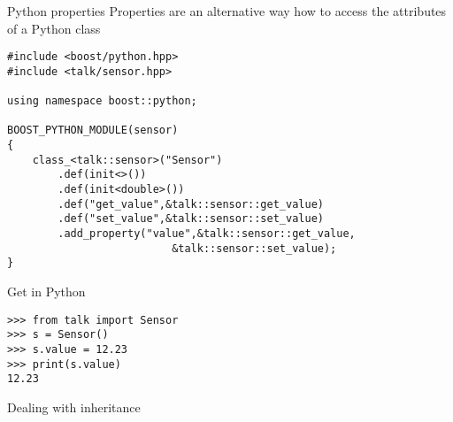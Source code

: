 \begin{frame}[fragile]{Python properties}
    Properties are an alternative way how to access the attributes of a Python
    class 
    \vspace{0.02\textheight}
    \begin{verbatim}
#include <boost/python.hpp>
#include <talk/sensor.hpp>

using namespace boost::python;

BOOST_PYTHON_MODULE(sensor)
{
    class_<talk::sensor>("Sensor")
        .def(init<>())
        .def(init<double>())
        .def("get_value",&talk::sensor::get_value)
        .def("set_value",&talk::sensor::set_value)
        .add_property("value",&talk::sensor::get_value,
                          &talk::sensor::set_value); 
}
    \end{verbatim}
    \vspace{0.03\textheight}
    Get in Python
    \vspace{0.02\textheight}
    \begin{verbatim}
>>> from talk import Sensor
>>> s = Sensor()
>>> s.value = 12.23
>>> print(s.value)
12.23
    \end{verbatim}
\end{frame}

\begin{frame}[fragile]{Dealing with inheritance}

\end{frame}


